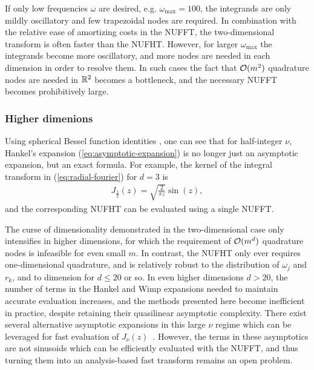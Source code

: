 If only low frequencies $\omega$ are desired, e.g. $\omega_{\text{max}} = 100$,
the integrands are only mildly oscillatory and few trapezoidal nodes are
required. In combination with the relative ease of amortizing costs in the
NUFFT, the two-dimensional transform is often faster than the NUFHT. However,
for larger $\omega_{\text{max}}$ the integrands become more oscillatory, and
more nodes are needed in each dimension in order to resolve them. In such cases
the fact that $\mathcal{O}(m^2)$ quadrature nodes are needed in $\mathbb{R}^2$ becomes a
bottleneck, and the necessary NUFFT becomes prohibitively large. 


\subsubsection{Higher dimenions}

Using spherical Bessel function identities \cite[10.47.3,
10.49.2]{olver2010nist}, one can see that for half-integer $\nu$, Hankel's
expansion (\ref{eq:asymptotic-expansion}) is no longer just an asymptotic
expansion, but an exact formula.
For example, the kernel of the integral transform in (\ref{eq:radial-fourier})
for $d = 3$ is
\begin{align}
  J_{\frac{1}{2}}(z) = \sqrt{\frac{2}{\pi z}} \sin(z),
\end{align}
and the corresponding NUFHT can be evaluated using a single NUFFT.

The curse of dimensionality demonstrated in the two-dimensional case only
intensifies in higher dimensions, for which the requirement of $\mathcal{O}(m^d)$
quadrature nodes is infeasible for even small $m$. In contrast, the NUFHT only
ever requires one-dimensional quadrature, and is relatively robust to the
distribution of $\omega_j$ and $r_k$, and to dimension for $d \leq 20$ or so. In
even higher dimensions $d > 20$, the number of terms in the Hankel and Wimp
expansions needed to maintain accurate evaluation increases, and the methods
presented here become inefficient in practice, despite retaining their
quasilinear asymptotic complexity. There exist several alternative asymptotic
expansions in this large $\nu$ regime which can be leveraged for fast evaluation
of $J_\nu(z)$~\cite{heitman2015asymptotics, olver2010nist}.
However, the
terms in these asymptotics are not sinusoids which can be efficiently evaluated
with the NUFFT, and thus turning them into an analysis-based fast transform
remains an open problem.
